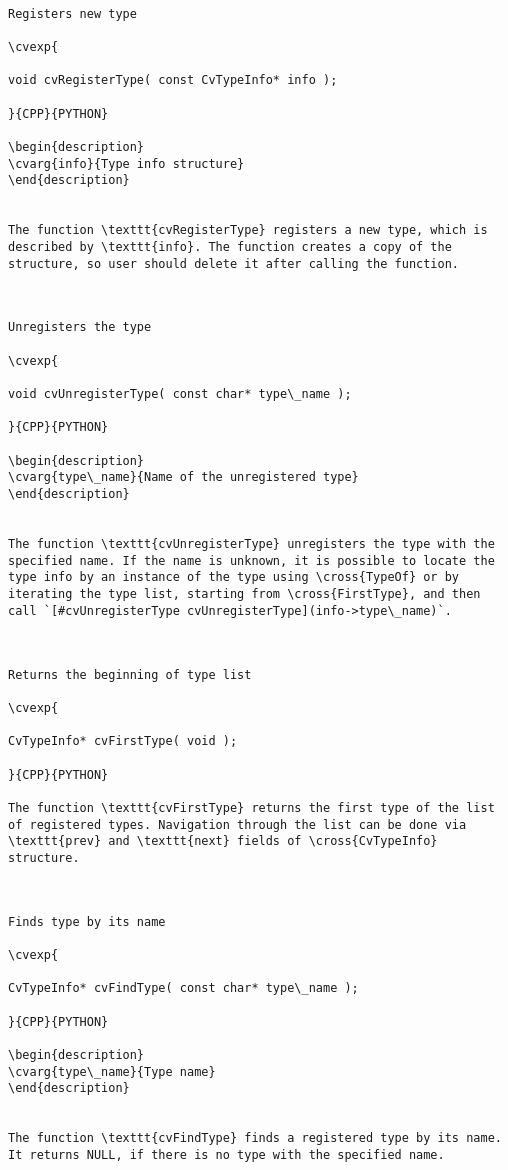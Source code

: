 \begin{verbatim}

Registers new type

\cvexp{

void cvRegisterType( const CvTypeInfo* info );

}{CPP}{PYTHON}

\begin{description}
\cvarg{info}{Type info structure}
\end{description}


The function \texttt{cvRegisterType} registers a new type, which is described by \texttt{info}. The function creates a copy of the structure, so user should delete it after calling the function.


\end{verbatim}
\begin{verbatim}

Unregisters the type

\cvexp{

void cvUnregisterType( const char* type\_name );

}{CPP}{PYTHON}

\begin{description}
\cvarg{type\_name}{Name of the unregistered type}
\end{description}


The function \texttt{cvUnregisterType} unregisters the type with the specified name. If the name is unknown, it is possible to locate the type info by an instance of the type using \cross{TypeOf} or by iterating the type list, starting from \cross{FirstType}, and then call `[#cvUnregisterType cvUnregisterType](info->type\_name)`.


\end{verbatim}
\begin{verbatim}

Returns the beginning of type list

\cvexp{

CvTypeInfo* cvFirstType( void );

}{CPP}{PYTHON}

The function \texttt{cvFirstType} returns the first type of the list of registered types. Navigation through the list can be done via \texttt{prev} and \texttt{next} fields of \cross{CvTypeInfo} structure.


\end{verbatim}
\begin{verbatim}

Finds type by its name

\cvexp{

CvTypeInfo* cvFindType( const char* type\_name );

}{CPP}{PYTHON}

\begin{description}
\cvarg{type\_name}{Type name}
\end{description}


The function \texttt{cvFindType} finds a registered type by its name. It returns NULL, if there is no type with the specified name.


\end{verbatim}
